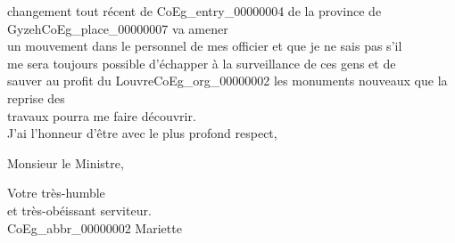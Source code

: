 \documentclass{book}
\begin{document}
changement tout récent de \Gls{CoEg_entry_00000004} de la province de Gyzeh\gls{CoEg_place_00000007} va amener\\
un mouvement dans le personnel de mes officier et que je ne sais pas s’il\\
me sera toujours possible d’échapper à la surveillance de ces gens et de\\
sauver au profit du Louvre\gls{CoEg_org_00000002} les monuments nouveaux que la reprise des\\
travaux pourra me faire découvrir.\\
\indent J’ai l’honneur d’être avec le plus profond respect,
\begin{center}Monsieur le Ministre,\end{center}
\begin{center}\hspace{5cm}Votre très-humble\\
\hspace{5cm}et très-obéissant serviteur.\\
\hspace{5cm}\gls{CoEg_abbr_00000002} Mariette\end{center}
\end{document}
